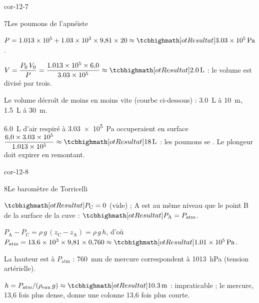 \begin{blocLivre}{cor-12-7}
\begin{corrige}{7}{Les poumons de l'apnéiste}
\begin{questions}
\item $P=\num{1,013e5}+\num{1,03e3}\times9{,}81\times20\approx\res{\qty{3,03e5}{Pa}}$.
\item $V=\dfrac{P_0\,V_0}{P}=\dfrac{\num{1,013e5}\times6{,}0}{\num{3,03e5}}\approx\res{\qty{2,0}{L}}$ : le volume est divisé par trois.
\item Le volume décroît de moins en moins vite (courbe ci-dessous) : \qty{3,0}{L} à \qty{10}{m}, \qty{1,5}{L} à \qty{30}{m}.
\item \qty{6,0}{L} d'air respiré à \qty{3,03e5}{Pa} occuperaient en surface $\dfrac{6{,}0\times\num{3,03e5}}{\num{1,013e5}}\approx\res{\qty{18}{L}}$ : les poumons se
. Le plongeur doit expirer en remontant.
\end{questions}
\end{corrige}
\end{blocLivre}
\begin{blocLivre}{cor-12-8}
\begin{corrige}{8}{Le baromètre de Torricelli}
\begin{questions}
\item $\res{P_\mathrm{C}=0}$ (vide) ; A est au même niveau que le point B de la surface de la cuve : $\res{P_\mathrm{A}=P_\mathrm{atm}}$.
\item $P_\mathrm{A}-P_\mathrm{C}=\rho\,g\,(z_\mathrm{C}-z_\mathrm{A})=\rho\,g\,h$, d'où $P_\mathrm{atm}=\num{13,6e3}\times9{,}81\times0{,}760\approx\res{\qty{1,01e5}{Pa}}$.
\item La hauteur est  à $P_\mathrm{atm}$ : \qty{760}{mm} de mercure correspondent à \qty{1013}{hPa} (tension artérielle).
\item $h=P_\mathrm{atm}/(\rho_\mathrm{eau}\,g)\approx\res{\qty{10,3}{m}}$ : impraticable ; le mercure, 13,6 fois plus dense, donne une colonne 13,6 fois plus courte.
\end{questions}
\end{corrige}
\end{blocLivre}
